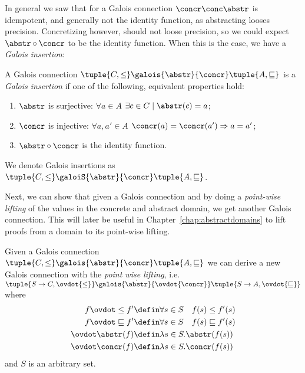 In general we saw that for a Galois connection \(\concr \conc \abstr\)
is idempotent, and generally not the identity function, as abstracting
looses precision. Concretizing however, should not loose precision, so
we could expect \(\abstr \circ \concr\) to be the identity
function. When this is the case, we have a \emph{Galois insertion}:

\begin{definition}\label{def:insertion}
  A Galois
  connection \(\tuple{C, \leq} \galois{\abstr}{\concr} \tuple{A,
    \sqsubseteq}\) is a \emph{Galois insertion} if one of the
  following, equivalent properties hold:
  \begin{enumerate}
  \item \(\abstr\) is surjective: \(\forall a \in A\)
    \(\exists c \in C \mid \abstr(c) = a\);
  \item \(\concr\) is injective: \(\forall a, a'\in A\)
    \(\concr(a) = \concr(a') \Rightarrow a = a'\);
  \item \(\abstr \circ \concr\) is the identity function.
  \end{enumerate}
  We denote Galois insertions as
  \(\tuple{C, \leq} \galoiS{\abstr}{\concr} \tuple{A, \sqsubseteq}\).
\end{definition}

Next, we can show that given a Galois connection and by doing a
\emph{point-wise lifting} of the values in the concrete and abstract
domain, we get another Galois connection. This will later be useful in
Chapter~\ref{chap:abstractdomains} to lift proofs from a domain to its
point-wise lifting.

\begin{theorem}\label{th:pointwiseconn}
  Given a Galois connection
  \(\tuple{C, \leq} \galois{\abstr}{\concr} \tuple{A, \sqsubseteq}\)
  we can derive a new Galois connection with the \emph{point wise
    lifting}, i.e.
  \(\tuple{S\to C, \ovdot{\leq}} \galois{\dot\abstr}{\ovdot{\concr}}
  \tuple{S\to A, \ovdot{\sqsubseteq}}\) where
  \begin{align*}
    f \ovdot\leq f' & \defin \forall s \in S \quad f(s) \leq f'(s)\\
    f \ovdot\sqsubseteq f' & \defin \forall s \in S \quad f(s) \sqsubseteq f'(s)\\
    \ovdot\abstr(f) & \defin \lambda s \in S . \abstr(f(s)) \\
    \ovdot\concr(f) & \defin \lambda s \in S . \concr(f(s)) \\
  \end{align*}
  and \(S\) is an arbitrary set.
\end{theorem}

